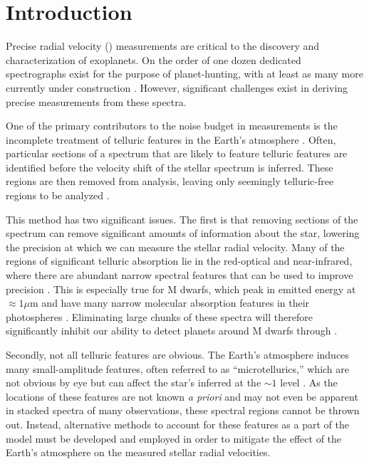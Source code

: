 \documentclass[modern]{aastex62}
\begin{document}

\section{Introduction}

Precise radial velocity (\RV) measurements are critical to the discovery and characterization of exoplanets. 
On the order of one dozen dedicated spectrographs exist for the purpose of \RV planet-hunting, with at least as many more currently under construction \citep{Wright2017}. 
However, significant challenges exist in deriving precise \RV measurements from these spectra. 

One of the primary contributors to the noise budget in \RV measurements is the incomplete treatment of telluric features in the
Earth's atmosphere \citep{Halverson2016}. 
Often, particular sections of a spectrum that are likely to feature telluric features are identified before the velocity shift of the stellar spectrum is inferred. 
These regions are then removed from analysis, leaving only seemingly telluric-free regions to be analyzed \citep[e.g.][]{AngladaEscude2012}.

This method has two significant issues. 
The first is that removing sections of the spectrum can remove significant amounts of information about the star, lowering the precision at which we can measure the stellar radial velocity. 
Many of the regions of significant telluric absorption lie in the red-optical and near-infrared, where there are abundant narrow spectral features that can be used to improve \RV precision \citep{Bottom2013}. 
This is especially true for M dwarfs, which peak in emitted energy at $\approx 1 \mu$m and have many narrow molecular absorption features in their photospheres \citep{Figueira2016}. 
Eliminating large chunks of these spectra will therefore significantly inhibit our ability to detect planets around M dwarfs through \RVs.

Secondly, not all telluric features are obvious. 
The Earth's atmosphere induces many small-amplitude features, often referred to as ``microtellurics,'' which are not obvious by eye but can affect the star's inferred \RV at the $\sim 1$ \ms level \citep{Cunha2014}. 
As the locations of these features are not known \textit{a priori} and may not even be apparent in stacked spectra of many observations, these spectral regions cannot be thrown out. 
Instead, alternative methods to account for these features as a part of the model must be developed and employed in order to mitigate the effect of the Earth's atmosphere on the measured stellar radial velocities.
\end{document}
